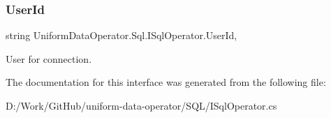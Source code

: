 \subsubsection{\texorpdfstring{User\+Id}{UserId}}
{\footnotesize\ttfamily string Uniform\+Data\+Operator.\+Sql.\+I\+Sql\+Operator.\+User\+Id\hspace{0.3cm}{\ttfamily [get]}, {\ttfamily [set]}}



User for connection. 



The documentation for this interface was generated from the following file\+:\begin{DoxyCompactItemize}
\item 
D\+:/\+Work/\+Git\+Hub/uniform-\/data-\/operator/\+S\+Q\+L/I\+Sql\+Operator.\+cs\end{DoxyCompactItemize}
